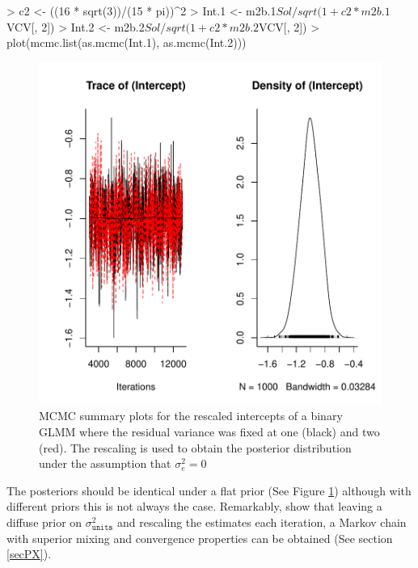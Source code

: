 \documentclass{article}
\begin{document}
\begin{Schunk}
\begin{Sinput}
> c2 <- ((16 * sqrt(3))/(15 * pi))^2
> Int.1 <- m2b.1$Sol/sqrt(1 + c2 * m2b.1$VCV[, 2])
> Int.2 <- m2b.2$Sol/sqrt(1 + c2 * m2b.2$VCV[, 2])
> plot(mcmc.list(as.mcmc(Int.1), as.mcmc(Int.2)))
\end{Sinput}
\end{Schunk}

\begin{figure}[!h]
\begin{center}
\includegraphics{Lecture2-069}
\end{center}
\caption{MCMC summary plots for the rescaled intercepts of a binary GLMM where the residual variance was fixed at one (black) and two (red). The rescaling is used to obtain the posterior distribution under the assumption that $\sigma^{2}_{e}=0$}
\label{ICI-fig}
\end{figure}

The posteriors should be identical under a flat prior (See Figure \ref{ICI-fig}) although with different priors this is not always the case. Remarkably, \citep{vanDyk.2001} show that leaving a diffuse prior on $\sigma^{2}_{\texttt{units}}$ and rescaling the estimates each iteration, a Markov chain with superior mixing and convergence properties can be obtained (See section \ref{secPX}).\\  
\end{document}
